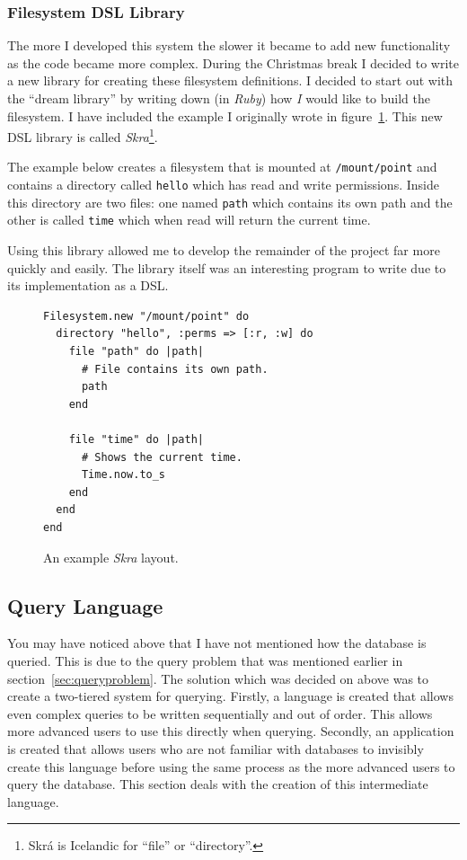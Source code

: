 \subsubsection{Filesystem DSL Library}

The more I developed this system the slower it became to add new functionality
as the code became more complex. During the Christmas break I decided to write
a new library for creating these filesystem definitions. I decided to start out
with the ``dream library'' by writing down (in \emph{Ruby}) how \emph{I} would
like to build the filesystem. I have included the example I originally wrote in
figure~\ref{fig:skra}. This new \ac{DSL} library is called
\emph{Skra}\footnote{Skr\'{a} is Icelandic for ``file'' or ``directory''.}.

The example below creates a filesystem that is mounted at \texttt{/mount/point}
and contains a directory called \texttt{hello} which has read and write
permissions. Inside this directory are two files: one named \texttt{path} which
contains its own path and the other is called \texttt{time} which when read
will return the current time.

Using this library allowed me to develop the remainder of the project far more
quickly and easily. The library itself was an interesting program to write due
to its implementation as a DSL.

\begin{figure}
\begin{verbatim}
Filesystem.new "/mount/point" do
  directory "hello", :perms => [:r, :w] do
    file "path" do |path|
      # File contains its own path.
      path
    end

    file "time" do |path|
      # Shows the current time.
      Time.now.to_s
    end
  end
end
\end{verbatim}
  \caption{An example \emph{Skra} layout.}
  \label{fig:skra}
\end{figure}

\subsection{Query Language}

You may have noticed above that I have not mentioned how the database is
queried. This is due to the query problem that was mentioned earlier in
section~\ref{sec:queryproblem}. The solution which was decided on above was to
create a two-tiered system for querying. Firstly, a language is created that
allows even complex queries to be written sequentially and out of order. This
allows more advanced users to use this directly when querying. Secondly, an
application is created that allows users who are not familiar with databases to
invisibly create this language before using the same process as the more
advanced users to query the database. This section deals with the creation of
this intermediate language.


